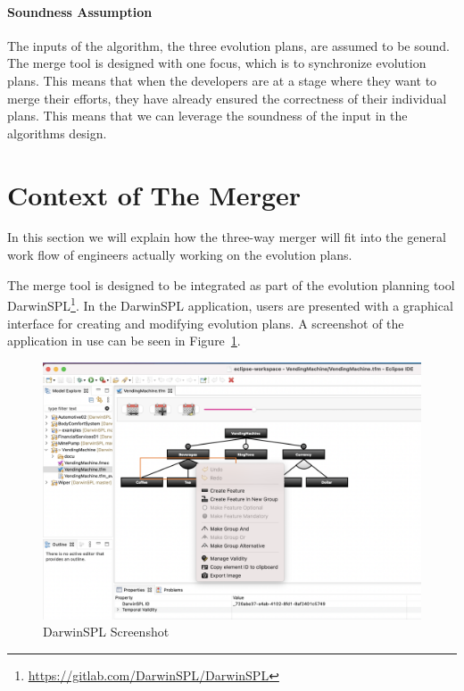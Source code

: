 \documentclass[a4paper,english]{ifimaster}
\begin{document}
\paragraph{Soundness Assumption}%
\label{par:soundness_assumption}

The inputs of the algorithm, the three evolution plans, are assumed to be sound. The merge tool is designed with one focus, which is to synchronize evolution plans. This means that when the developers are at a stage where they want to merge their efforts, they have already ensured the correctness of their individual plans. This means that we can leverage the soundness of the input in the algorithms design. 

\section{Context of The Merger}%
\label{sec:context_of_the_merger}

In this section we will explain how the three-way merger will fit into the general work flow of engineers actually working on the evolution plans.

The merge tool is designed to be integrated as part of the evolution planning tool DarwinSPL\footnote{\url{https://gitlab.com/DarwinSPL/DarwinSPL}}. In the DarwinSPL application, users are presented with a graphical interface for creating and modifying evolution plans. A screenshot of the application in use can be seen in Figure~\ref{fig:darwin_spl_screenshot}.

\begin{figure}[htpb]
  \centering
  \includegraphics[width=\linewidth]{darwin_spl_screenshot.png}
  \caption{DarwinSPL Screenshot}%
  \label{fig:darwin_spl_screenshot}
\end{figure}
\end{document}

